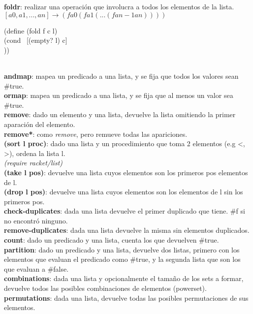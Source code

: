 \documentclass[11pt,a4paper]{article}
\begin{document}
\noindent \textbf{foldr}: realizar una operaci\'on que involucra a todos los elementos de la lista. $[a0, a1, ..., an] \rightarrow (f a0 (f a1 (... (f an-1 an))))$
\begin{siderules}
(define (fold f c l)\\
\indent \indent \indent (cond \ [(empty? l) c]\\
\indent \indent \indent \indent {}))
\end{siderules}

\noindent \dotfill\\

\noindent \textbf{andmap}: mapea un predicado a una lista, y se fija que todos los valores sean \#true.\\ 

\noindent \textbf{ormap}: mapea un predicado a una lista, y se fija que al menos un valor sea \#true.\\

\noindent \textbf{remove}: dado un elemento y una lista, devuelve la lista omitiendo la primer aparaci\'on del elemento.\\

\noindent \textbf{remove*}: como \textit{remove}, pero remueve todas las apariciones.\\

\noindent \textbf{(sort l proc)}: dado una lista y un procedimiento que toma 2 elementos (e.g <, >), ordena la lista l.\\

\textit{(require racket/list)}\\

\noindent \textbf{(take l pos)}: devuelve una lista cuyos elementos son los primeros pos elementos de l.\\

\noindent \textbf{(drop l pos)}: devuelve una lista cuyos elementos son los elementos de l sin los primeros pos.\\

\noindent \textbf{check-duplicates}: dada una lista devuelve el primer duplicado que tiene. \#f si no encontr\'o ninguno.\\

\noindent \textbf{remove-duplicates}: dada una lista devuelve la misma sin elementos duplicados.\\

\noindent \textbf{count}: dado un predicado y una lista, cuenta los que devuelven \#true.\\

\noindent \textbf{partition}: dado un predicado y una lista, devuelve dos listas, primero con los elementos que evaluan el predicado como \#true, y la segunda lista que son los que evaluan a \#false.\\

\noindent \textbf{combinations}: dada una lista y opcionalmente el tama\~no de los sets a formar, devuelve todos las posibles combinaciones de elementos (powerset).\\

\noindent \textbf{permutations}: dada una lista, devuelve todas las posibles permutaciones de sus elementos.
\end{document}
